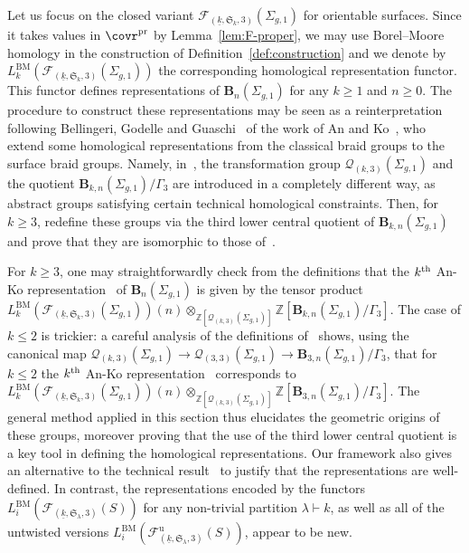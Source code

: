 \documentclass[AHL,Unicode,published]{cedram}
\newcommand{\pr}{\ensuremath{\mathrm{pr}}}
\newcommand{\BM}{\mathrm{BM}}
\newcommand{\unt}{\mathrm{u}}
\newcommand{\B}{\ensuremath{\mathbf{B}}}
\newcommand{\LCS}{\varGamma}
\newcommand{\Sym}{\mathfrak{S}}
\newcommand{\cF}{\mathcal{F}}
\newcommand{\cQ}{\mathcal{Q}}
\newcommand{\bZ}{\mathbb{Z}}
\renewcommand{\geq}{\geqslant}
\renewcommand{\leq}{\leqslant}
\begin{document}
\begin{exam}\label{eg:An-Ko}
Let us focus on the closed variant $\cF_{(\underline{k},\Sym_{k},3)}(\Sigma_{g,1})$ for orientable surfaces. Since it takes values in $\covr^{\pr}$ by Lemma~\ref{lem:F-proper}, we may use Borel--Moore homology in the construction of Definition~\ref{def:construction} and we denote by $L^{\BM}_{k}(\cF_{(\underline{k},\Sym_{k},3)}(\Sigma_{g,1}))$ the corresponding homological representation functor. This functor defines representations of $\B_{n}(\Sigma_{g,1})$ for any $k\geq 1$ and $n\geq 0$. The procedure to construct these representations may be seen as a reinterpretation following Bellingeri, Godelle and Guaschi~\cite{BellingeriGodelleGuaschi} of the work of An and Ko~\cite{AnKo}, who extend some homological representations from the classical braid groups to the surface braid groups. Namely, in~\cite[\S~3.A]{AnKo}, the transformation group $\cQ_{(k,3)}(\Sigma_{g,1})$ and the quotient $\B_{k,n}(\Sigma_{g,1})/\LCS_{3}$ are introduced in a completely different way, as abstract groups satisfying certain technical homological constraints. Then, for $k\geq 3$, \cite[\S~4]{BellingeriGodelleGuaschi} redefine these groups via the third lower central quotient of $\B_{k,n}(\Sigma_{g,1})$ and prove that they are isomorphic to those of~\cite[\S~3.A]{AnKo}.

For $k\geq 3$, one may straightforwardly check from the definitions that the $k^{\rm th}$ An-Ko representation~\cite[Th.~3.2]{AnKo} of $\B_{n}(\Sigma_{g,1})$ is given by the tensor product $L^{\BM}_{k}(\cF_{(\underline{k},\Sym_{k},3)}(\Sigma_{g,1}))(n) \otimes_{\bZ[\cQ_{(k,3)}(\Sigma_{g,1})]} \bZ[\B_{k,n}(\Sigma_{g,1})/\LCS_{3}]$. The case of $k\leq2$ is trickier: a careful analysis of the definitions of~\cite[\S~3.A]{AnKo} shows, using the canonical map $\cQ_{(k,3)}(\Sigma_{g,1})\to \cQ_{(3,3)}(\Sigma_{g,1})\to \B_{3,n}(\Sigma_{g,1})/\LCS_{3}$, that for $k\leq 2$ the $k^{\rm th}$ An-Ko representation~\cite[Th.~3.2]{AnKo} corresponds to $L^{\BM}_{k}(\cF_{(\underline{k},\Sym_{k},3)}(\Sigma_{g,1}))(n) \otimes_{\bZ[\cQ_{(k,3)}(\Sigma_{g,1})]} \bZ[\B_{3,n}(\Sigma_{g,1})/\LCS_{3}]$. The general method applied in this section thus elucidates the geometric origins of these groups, moreover proving that the use of the third lower central quotient is a key tool in defining the homological representations. Our framework also gives an alternative to the technical result~\cite[Lem.~3.1]{AnKo} to justify that the representations are well-defined. In contrast, the representations encoded by the functors $L_{i}^{\BM}(\cF_{(\underline{k},\Sym_{\lambda},3)}(S))$ for any non-trivial partition $\lambda\vdash k$, as well as all of the untwisted versions $L_{i}^{\BM}(\cF^{\unt}_{(\underline{k},\Sym_{\lambda},3)}(S))$, appear to be new.
\end{exam}
\end{document}
